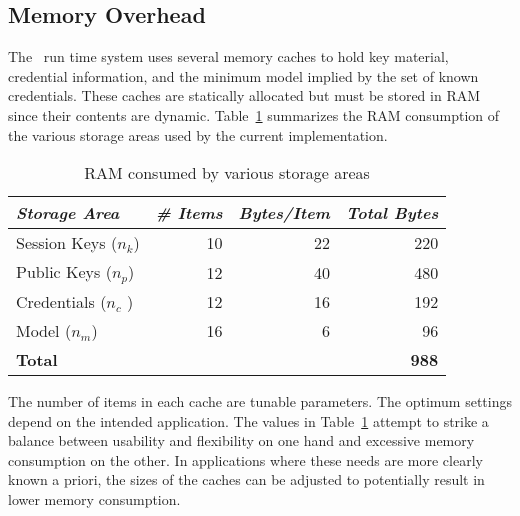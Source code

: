 \subsection{Memory Overhead}
\label{section-sprocket-memory-performance}

The \Sprocket\ run time system uses several memory caches to hold key material, credential
information, and the minimum model implied by the set of known credentials. These caches are
statically allocated but must be stored in RAM since their contents are dynamic.
Table~\ref{table-ram-consumed} summarizes the RAM consumption of the various storage areas used
by the current implementation.

\begin{table}[!t]
  \newcommand\T{\rule{0pt}{2.1ex}}
  \centering
  \caption{RAM consumed by various storage areas}
  {
  \begin{tabular}{|l|r|r|r|} \hline
    \textit{Storage Area} \T & \textit{\# Items} & \textit{Bytes/Item} & \textit{Total Bytes} \\
    \hline \hline

    Session Keys ($n_k$) \T & 10 & 22 & 220 \\ \hline 
    Public Keys ($n_p$)  \T & 12 & 40 & 480 \\ \hline
    Credentials ($n_c$ ) \T & 12 & 16 & 192 \\ \hline
    Model ($n_m$)        \T & 16 &  6 &  96 \\ \hline \hline
    \textbf{Total} \T & \multicolumn{3}{r|}{ \textbf{988} } \\ \hline
  \end{tabular}
  }
  \label{table-ram-consumed}
\end{table}

The number of items in each cache are tunable parameters. The optimum settings depend on the
intended application. The values in Table~\ref{table-ram-consumed} attempt to strike a balance
between usability and flexibility on one hand and excessive memory consumption on the other. In
applications where these needs are more clearly known a priori, the sizes of the caches can be
adjusted to potentially result in lower memory consumption.


